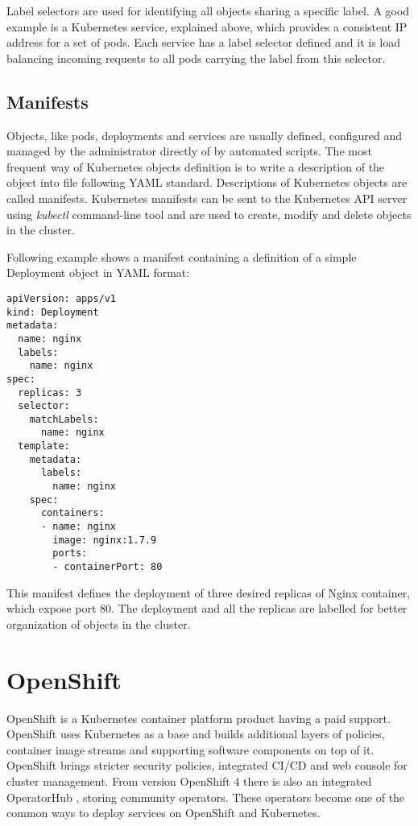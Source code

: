 \documentclass[
  digital, %
  twoside, %
  table,   %
  nolof,   %
  nolot,   %
]{fithesis3}
\begin{document}
Label selectors are used for identifying all objects sharing a specific label. A good example is a Kubernetes service, explained above, which provides a consistent IP address for a set of pods. Each service has a label selector defined and it is load balancing incoming requests to all pods carrying the label from this selector.

\subsection{Manifests} \label{sec:manifest}
Objects, like pods, deployments and services are usually defined, configured and managed by the administrator directly of by automated scripts. The most frequent way of Kubernetes objects definition is to write a description of the object into file following YAML \cite{YAML} standard. Descriptions of Kubernetes objects are called manifests. Kubernetes manifests can be sent to the Kubernetes API server \cite{kubernetes-api} using \textit{kubectl} \cite{kubectl} command-line tool and are used to create, modify and delete objects in the cluster.

Following example shows a manifest containing a definition of a simple Deployment object in YAML format:
\begin{lstlisting}
apiVersion: apps/v1
kind: Deployment
metadata:
  name: nginx
  labels:
    name: nginx
spec:
  replicas: 3
  selector:
    matchLabels:
      name: nginx
  template:
    metadata:
      labels:
        name: nginx
    spec:
      containers:
      - name: nginx
        image: nginx:1.7.9
        ports:
        - containerPort: 80
\end{lstlisting}

This manifest defines the deployment of three desired replicas of Nginx \cite{nginx} container, which expose port 80. The deployment and all the replicas are labelled for better organization of objects in the cluster.

\section{OpenShift} \label{sec:openshift}
OpenShift \cite{rhccos} is a Kubernetes container platform product having a paid support. OpenShift uses Kubernetes as a base and builds additional layers of policies, container image streams and supporting software components on top of it. OpenShift brings stricter security policies, integrated CI/CD and web console for cluster management. From version OpenShift 4 there is also an integrated OperatorHub \cite{operatorhub}, storing community operators. These operators become one of the common ways to deploy services on OpenShift and Kubernetes.
\end{document}
